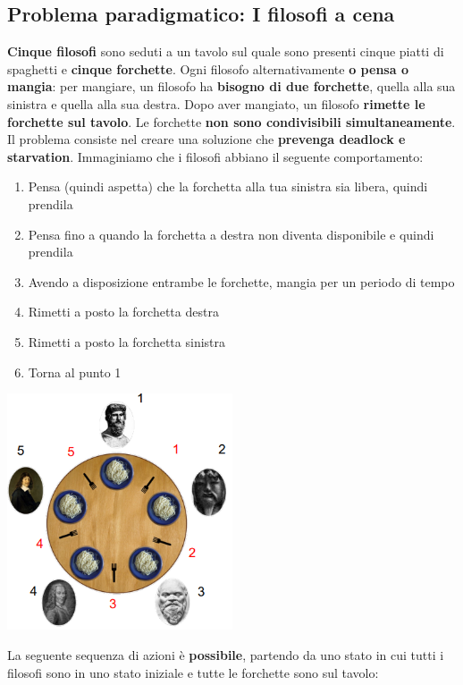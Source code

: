 \documentclass[12pt]{article}
\begin{document}
\subsection{Problema paradigmatico: I filosofi a cena}
\textbf{Cinque filosofi} sono seduti a un tavolo sul quale sono presenti cinque piatti di spaghetti e \textbf{cinque forchette}. Ogni filosofo alternativamente \textbf{o pensa o mangia}: per mangiare, un filosofo ha \textbf{bisogno di due forchette}, quella alla sua sinistra e quella alla sua destra. Dopo aver mangiato, un filosofo \textbf{rimette le forchette sul tavolo}. Le forchette \textbf{non sono condivisibili simultaneamente}. Il problema consiste nel creare una soluzione che \textbf{prevenga deadlock e starvation}. \newline
Immaginiamo che i filosofi abbiano il seguente comportamento:
\begin{enumerate}
    \item Pensa (quindi aspetta) che la forchetta alla tua sinistra sia libera, quindi prendila
    \item Pensa fino a quando la forchetta a destra non diventa disponibile e quindi prendila
    \item Avendo a disposizione entrambe le forchette, mangia per un periodo di tempo
    \item Rimetti a posto la forchetta destra
    \item Rimetti a posto la forchetta sinistra
    \item Torna al punto 1
\end{enumerate}
\begin{center}
    \includegraphics[width = 0.50\textwidth]{Images/105.png}
\end{center}
La seguente sequenza di azioni è \textbf{possibile}, partendo da uno stato in cui tutti i filosofi sono in uno stato iniziale e tutte le forchette sono sul tavolo:
\end{document}
